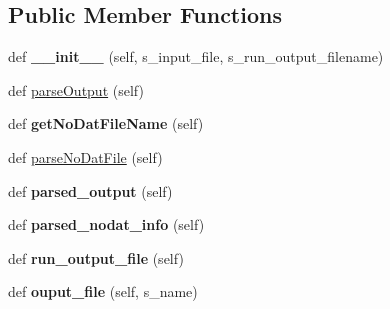 \subsection*{Public Member Functions}
\begin{DoxyCompactItemize}
\item 
def {\bfseries \+\_\+\+\_\+init\+\_\+\+\_\+} (self, s\+\_\+input\+\_\+file, s\+\_\+run\+\_\+output\+\_\+filename)\hypertarget{classnegui_1_1pgoutputneestimator_1_1PGOutputNeEstimator_a668859c930e6bd9b31bda4af9bd79c54}{}\label{classnegui_1_1pgoutputneestimator_1_1PGOutputNeEstimator_a668859c930e6bd9b31bda4af9bd79c54}

\item 
def \hyperlink{classnegui_1_1pgoutputneestimator_1_1PGOutputNeEstimator_a7b6885cf565cb604ab24d7082858f57b}{parse\+Output} (self)
\item 
def {\bfseries get\+No\+Dat\+File\+Name} (self)\hypertarget{classnegui_1_1pgoutputneestimator_1_1PGOutputNeEstimator_a10c975df76c0f893c4814cf0b492cae6}{}\label{classnegui_1_1pgoutputneestimator_1_1PGOutputNeEstimator_a10c975df76c0f893c4814cf0b492cae6}

\item 
def \hyperlink{classnegui_1_1pgoutputneestimator_1_1PGOutputNeEstimator_a4f8192c2aacf6e38b2c4c1d80302b643}{parse\+No\+Dat\+File} (self)
\item 
def {\bfseries parsed\+\_\+output} (self)\hypertarget{classnegui_1_1pgoutputneestimator_1_1PGOutputNeEstimator_ae97f8f35f02d9026bc1796daa3ed7aca}{}\label{classnegui_1_1pgoutputneestimator_1_1PGOutputNeEstimator_ae97f8f35f02d9026bc1796daa3ed7aca}

\item 
def {\bfseries parsed\+\_\+nodat\+\_\+info} (self)\hypertarget{classnegui_1_1pgoutputneestimator_1_1PGOutputNeEstimator_a9842661b1a2ff8f5b0fb95cdbf45c1f9}{}\label{classnegui_1_1pgoutputneestimator_1_1PGOutputNeEstimator_a9842661b1a2ff8f5b0fb95cdbf45c1f9}

\item 
def {\bfseries run\+\_\+output\+\_\+file} (self)\hypertarget{classnegui_1_1pgoutputneestimator_1_1PGOutputNeEstimator_a5e510dccae0f66ae63f86d46e6c46a36}{}\label{classnegui_1_1pgoutputneestimator_1_1PGOutputNeEstimator_a5e510dccae0f66ae63f86d46e6c46a36}

\item 
def {\bfseries ouput\+\_\+file} (self, s\+\_\+name)\hypertarget{classnegui_1_1pgoutputneestimator_1_1PGOutputNeEstimator_ae1d4e1c9f11e5050f0e839e74968c31f}{}\label{classnegui_1_1pgoutputneestimator_1_1PGOutputNeEstimator_ae1d4e1c9f11e5050f0e839e74968c31f}


\end{DoxyCompactItemize}

